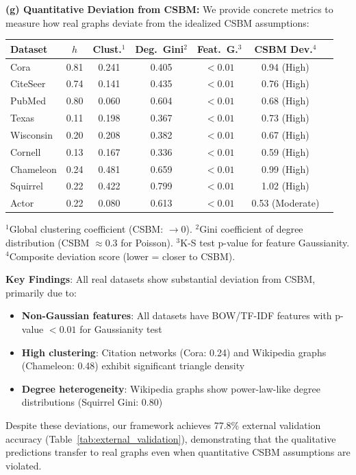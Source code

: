 \begin{remark}
\textbf{(g) Quantitative Deviation from CSBM:}
We provide concrete metrics to measure how real graphs deviate from the idealized CSBM assumptions:

\begin{center}
\small
\begin{tabular}{lcccccc}
\toprule
\textbf{Dataset} & $h$ & \textbf{Clust.}$^1$ & \textbf{Deg.\ Gini}$^2$ & \textbf{Feat.\ G.}$^3$ & \textbf{CSBM Dev.}$^4$ \\
\midrule
Cora & 0.81 & 0.241 & 0.405 & $<0.01$ & 0.94 (High) \\
CiteSeer & 0.74 & 0.141 & 0.435 & $<0.01$ & 0.76 (High) \\
PubMed & 0.80 & 0.060 & 0.604 & $<0.01$ & 0.68 (High) \\
Texas & 0.11 & 0.198 & 0.367 & $<0.01$ & 0.73 (High) \\
Wisconsin & 0.20 & 0.208 & 0.382 & $<0.01$ & 0.67 (High) \\
Cornell & 0.13 & 0.167 & 0.336 & $<0.01$ & 0.59 (High) \\
Chameleon & 0.24 & 0.481 & 0.659 & $<0.01$ & 0.99 (High) \\
Squirrel & 0.22 & 0.422 & 0.799 & $<0.01$ & 1.02 (High) \\
Actor & 0.22 & 0.080 & 0.613 & $<0.01$ & 0.53 (Moderate) \\
\bottomrule
\end{tabular}
\end{center}
$^1$Global clustering coefficient (CSBM: $\to 0$). $^2$Gini coefficient of degree distribution (CSBM $\approx 0.3$ for Poisson). $^3$K-S test p-value for feature Gaussianity. $^4$Composite deviation score (lower = closer to CSBM).

\textbf{Key Findings}: All real datasets show substantial deviation from CSBM, primarily due to:
\begin{itemize}
    \item \textbf{Non-Gaussian features}: All datasets have BOW/TF-IDF features with p-value $< 0.01$ for Gaussianity test
    \item \textbf{High clustering}: Citation networks (Cora: 0.24) and Wikipedia graphs (Chameleon: 0.48) exhibit significant triangle density
    \item \textbf{Degree heterogeneity}: Wikipedia graphs show power-law-like degree distributions (Squirrel Gini: 0.80)
\end{itemize}

Despite these deviations, our framework achieves 77.8\% external validation accuracy (Table~\ref{tab:external_validation}), demonstrating that the qualitative predictions transfer to real graphs even when quantitative CSBM assumptions are violated.
\end{remark}


